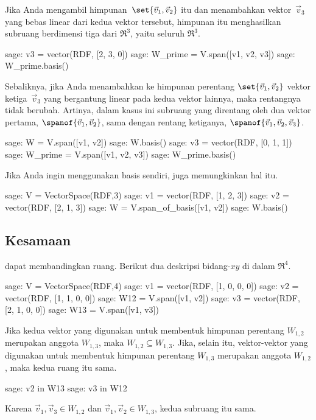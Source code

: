 Jika Anda mengambil himpunan~$\set{\vec{v}_1,\vec{v}_2}$ itu dan menambahkan vektor~$\vec{v}_3$ yang
bebas linear dari kedua vektor tersebut, 
himpunan itu menghasilkan subruang berdimensi tiga dari $\Re^3$, 
yaitu seluruh $\Re^3$.
\begin{sagecommandline}
sage: v3 = vector(RDF, [2, 3, 0])
sage: W_prime = V.span([v1, v2, v3])
sage: W_prime.basis()
\end{sagecommandline}
Sebaliknya, jika Anda menambahkan ke himpunan perentang $\set{\vec{v}_1,\vec{v}_2}$ 
vektor ketiga~$\vec{v}_3$ 
yang bergantung linear pada kedua vektor lainnya, maka
rentangnya tidak berubah.
Artinya, dalam kasus ini subruang yang direntang oleh dua vektor pertama,
$\spanof{\vec{v}_1,\vec{v}_2}$,
sama dengan rentang ketiganya,
$\spanof{\vec{v}_1,\vec{v}_2,\vec{v}_3}$.
\begin{sagecommandline}
sage: W = V.span([v1, v2])       
sage: W.basis()
sage: v3 = vector(RDF, [0, 1, 1])
sage: W_prime = V.span([v1, v2, v3])
sage: W_prime.basis()
\end{sagecommandline}

Jika Anda ingin menggunakan basis sendiri, \Sage{} juga
memungkinkan hal itu.
\begin{sagecommandline}
sage: V = VectorSpace(RDF,3)
sage: v1 = vector(RDF, [1, 2, 3])
sage: v2 = vector(RDF, [2, 1, 3])
sage: W = V.span_of_basis([v1, v2])
sage: W.basis()
\end{sagecommandline}




\subsection{Kesamaan}

\Sage{} dapat membandingkan ruang.
Berikut dua deskripsi bidang-$xy$ di dalam $\Re^4$.
\begin{sagecommandline}
sage: V = VectorSpace(RDF,4)
sage: v1 = vector(RDF, [1, 0, 0, 0])
sage: v2 = vector(RDF, [1, 1, 0, 0])
sage: W12 = V.span([v1, v2])
sage: v3 = vector(RDF, [2, 1, 0, 0])
sage: W13 = V.span([v1, v3])  
\end{sagecommandline}
Jika kedua vektor yang digunakan untuk membentuk himpunan perentang $W_{1,2}$ 
merupakan anggota $W_{1,3}$, maka $W_{1,2}\subseteq W_{1,3}$.
Jika, selain itu, vektor-vektor yang digunakan untuk membentuk himpunan perentang $W_{1,3}$ 
merupakan anggota $W_{1,2}$, maka kedua ruang itu sama.
\begin{sagecommandline}
sage: v2 in W13
sage: v3 in W12
\end{sagecommandline}
Karena $\vec{v}_1,\vec{v}_3\in W_{1,2}$ dan 
$\vec{v}_1,\vec{v}_2\in W_{1,3}$, kedua subruang itu sama.

